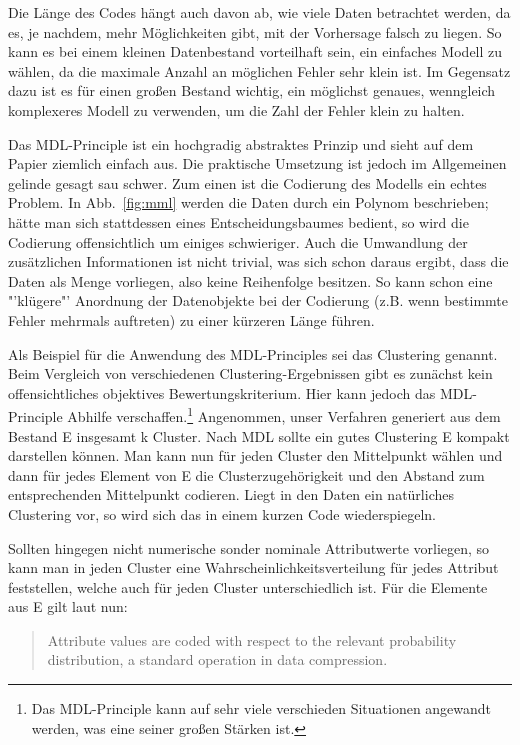 Die Länge des Codes hängt auch davon ab, wie viele Daten betrachtet werden, da es,
je nachdem, mehr Möglichkeiten gibt, mit der Vorhersage falsch zu liegen.
So kann es bei einem kleinen Datenbestand vorteilhaft sein, ein einfaches Modell
zu wählen, da die maximale Anzahl an möglichen Fehler sehr klein ist. Im Gegensatz
dazu ist es für einen großen Bestand wichtig, ein möglichst genaues, wenngleich komplexeres
Modell zu verwenden, um die Zahl der Fehler klein zu halten.

Das MDL-Principle ist ein hochgradig abstraktes Prinzip und sieht auf dem Papier
ziemlich einfach aus. Die praktische Umsetzung ist jedoch im Allgemeinen gelinde
gesagt sau schwer. Zum einen ist die Codierung des Modells ein echtes Problem.
In Abb.~\ref{fig:mml} werden die Daten durch ein Polynom beschrieben;
hätte man sich stattdessen eines Entscheidungsbaumes bedient, so wird die
Codierung offensichtlich um einiges schwieriger. Auch die Umwandlung der 
zusätzlichen Informationen ist nicht trivial, was sich schon daraus ergibt, dass
die Daten als Menge vorliegen, also keine Reihenfolge besitzen. 
So kann schon eine "'klügere"'
Anordnung der Datenobjekte bei der Codierung (z.B. wenn bestimmte Fehler mehrmals
auftreten) zu einer kürzeren Länge führen. 

Als Beispiel für die Anwendung des MDL-Principles sei das Clustering genannt.
Beim Vergleich von verschiedenen Clustering-Ergebnissen
gibt es zunächst kein offensichtliches objektives Bewertungskriterium.
Hier kann jedoch das MDL-Principle Abhilfe verschaffen.\footnote{Das MDL-Principle
kann auf sehr viele verschieden Situationen angewandt werden, was eine seiner 
großen Stärken ist.} Angenommen, unser Verfahren generiert aus dem Bestand E insgesamt
k Cluster. Nach MDL sollte ein gutes Clustering E kompakt darstellen können. Man
kann nun für jeden Cluster den Mittelpunkt wählen und dann für jedes Element von
E die Clusterzugehörigkeit und den Abstand zum entsprechenden Mittelpunkt codieren.
Liegt in den Daten ein natürliches Clustering vor, so wird sich das in einem 
kurzen Code wiederspiegeln.

Sollten hingegen nicht numerische sonder nominale Attributwerte vorliegen, so
kann man in jeden Cluster eine Wahrscheinlichkeitsverteilung für jedes Attribut
feststellen, welche auch für jeden Cluster unterschiedlich ist. Für die Elemente aus
E gilt laut \citet{Witten11} nun:
\begin{quote}
	\glqq Attribute values are coded with respect to the relevant probability
	distribution, a standard operation in data compression. \grqq
\end{quote}